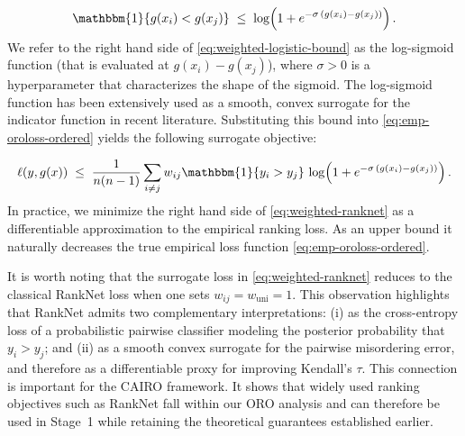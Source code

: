 \documentclass[11pt]{article}
\theoremstyle{plain}
\theoremstyle{plain}
\theoremstyle{plain}
\theoremstyle{plain}
\theoremstyle{plain}
\theoremstyle{plain}
\theoremstyle{plain}
\begin{document}
\begin{equation}
\label{eq:weighted-logistic-bound}
\mathbbm{1}\{g(x_i)<g(x_j)\}
\;\le\;
\log\!\left(1+e^{-\sigma\,(g(x_i)-g(x_j))}\right) .
\end{equation}
We refer to the right hand side of \eqref{eq:weighted-logistic-bound} as the log-sigmoid function (that is evaluated at $g(x_i)-g(x_j)$), where $\sigma>0$ is a hyperparameter that characterizes the shape of the sigmoid. The log-sigmoid function has been extensively used as a smooth, convex surrogate for the indicator function in recent literature. Substituting this bound into \eqref{eq:emp-oroloss-ordered} yields the following surrogate objective: 

\begin{align}
\label{eq:weighted-ranknet}
\ell(y, g(x))
\;\le\;
\frac{1}{n(n-1)}\sum_{i\ne j}
w_{ij}\mathbbm{1}\{y_i>y_j\}\,
\log\!\left(1+e^{-\sigma\,(g(x_i)-g(x_j))}\right).
\end{align}
In practice, we minimize the right hand side of \eqref{eq:weighted-ranknet} as a differentiable approximation to the empirical ranking loss. As an upper bound it naturally decreases the true empirical loss function \eqref{eq:emp-oroloss-ordered}.

It is worth noting that the surrogate loss in \eqref{eq:weighted-ranknet} reduces to the classical RankNet loss when one sets $w_{ij} = w_{\mathrm{uni}} = 1$. This observation highlights that RankNet admits two complementary interpretations: (i) as the cross-entropy loss of a probabilistic pairwise classifier modeling the posterior probability that $y_i > y_j$; and (ii) as a smooth convex surrogate for the pairwise misordering error, and therefore as a differentiable proxy for improving Kendall's $\tau$. This connection is important for the \textsc{CAIRO} framework. It shows that widely used ranking objectives such as RankNet fall within our ORO analysis and can therefore be used in Stage~1 while retaining the theoretical guarantees established earlier.
 
\end{document}
